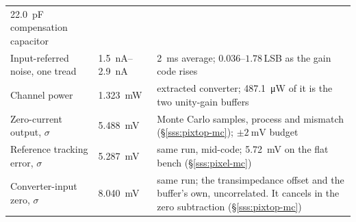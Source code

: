 \begin{table}[!htb]
{\begin{tabular}{@{}%
    >{\raggedright\arraybackslash}p{}%
    >{\raggedleft\arraybackslash}p{}%
    >{\raggedright\arraybackslash}p{}@{}}
      \SI{22.0}{\pico\farad} compensation capacitor \\
    Input-referred noise, one tread &
      \SIrange{1.5}{2.9}{\nano\ampere} &
      \SI{2}{\milli\second} average; \(0.036\)--\(1.78\,\)LSB as the gain code
      rises \\
    Channel power &
      \SI{1.323}{\milli\watt} &
      extracted converter; \SI{487.1}{\micro\watt} of it is the two
      unity-gain buffers \\
    \addlinespace
    Zero-current output, \(\sigma\) &
      \SI{5.488}{\milli\volt} &
      200 Monte Carlo samples, process and mismatch
      (\S\ref{sss:pixtop-mc}); \(\pm\SI{2}{\milli\volt}\) budget \\
    Reference tracking error, \(\sigma\) &
      \SI{5.287}{\milli\volt} &
      same run, mid-code; \SI{5.72}{\milli\volt} on the flat bench
      (\S\ref{sss:pixel-mc}) \\
    Converter-input zero, \(\sigma\) &
      \SI{8.040}{\milli\volt} &
      same run; the transimpedance offset and the buffer's own, uncorrelated.
      It cancels in the zero subtraction (\S\ref{sss:pixtop-mc}) \\
    \bottomrule
  \end{tabular}}
\end{table}
